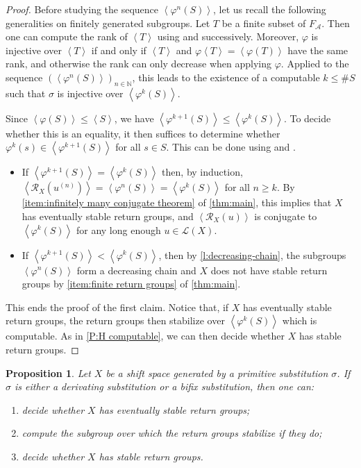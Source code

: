 \documentclass{amsart}
\newcommand*{\N}{\mathbb{N}}
\newcommand*{\ret}{\mathcal{R}}
\newcommand*{\lang}{\mathcal{L}}
\newcommand*{\cA}{\mathcal{A}}
\newcommand*{\card}{\#}
\newcommand*{\gen}[1]{\left\langle #1\right\rangle}
\theoremstyle{plain}
\newtheorem{proposition}[theorem]{Proposition}
\theoremstyle{definition}
\theoremstyle{remark}
\begin{document}
\begin{proof}
    Before studying the sequence $\gen{\varphi^n(S)}$, let us recall the following generalities on finitely generated subgroups. Let $T$ be a finite subset of $F_\cA$. Then one can compute the rank of $\gen{T}$ using \cite[Proposition~7.1]{Kapovich2002} and \cite[Proposition~8.2]{Kapovich2002} successively. Moreover, $\varphi$ is injective over $\gen{T}$ if and only if $\gen{T}$ and $\varphi\gen{T} = \gen{\varphi(T)}$ have the same rank, and otherwise the rank can only decrease when applying $\varphi$.
    Applied to the sequence $(\gen{\varphi^n(S)})_{n \in \N}$, this leads to the existence of a computable $k \leq \card S$ such that $\sigma$ is injective over $\gen{\varphi^k(S)}$.

    Since $\gen{\varphi(S)} \leq \gen{S}$, we have $\gen{\varphi^{k+1}(S)} \leq \gen{\varphi^k(S)}$.
    To decide whether this is an equality, it then suffices to determine whether $\varphi^k(s) \in \gen{\varphi^{k+1}(S)}$ for all $s \in S$. This can be done using \cite[Proposition~7.1]{Kapovich2002} and \cite[Proposition~7.2]{Kapovich2002}.
    \begin{itemize}
    \item If $\gen{\varphi^{k+1}(S)} = \gen{\varphi^k(S)}$ then, by induction, $\gen{\ret_X(u^{(n)})} = \gen{\varphi^n(S)} = \gen{\varphi^k(S)}$ for all $n \geq k$. By \cref{item:infinitely many conjugate theorem} of \cref{thm:main}, this implies that $X$ has eventually stable return groups, and $\gen{\ret_X(u)}$ is conjugate to $\gen{\varphi^k(S)}$ for any long enough $u \in \lang(X)$.
    \item If $\gen{\varphi^{k+1}(S)} < \gen{\varphi^k(S)}$, then by \cref{l:decreasing-chain}, the subgroups $\gen{\varphi^n(S)}$ form a decreasing chain and $X$ does not have stable return groups by \cref{item:finite return groups} of \cref{thm:main}. 
    \end{itemize}
    This ends the proof of the first claim. Notice that, if $X$ has eventually stable return groups, the return groups then stabilize over $\gen{\varphi^k(S)}$ which is computable. As in \cref{P:H computable}, we can then decide whether $X$ has stable return groups.
\end{proof}

\begin{proposition}\label{P:decidable for derivating and bifix}
    Let $X$ be a shift space generated by a primitive substitution $\sigma$. If $\sigma$ is either a derivating substitution or a bifix substitution, then one can:
    \begin{enumerate}
        \item decide whether $X$ has eventually stable return groups;
        \item compute the subgroup over which the return groups stabilize if they do;
        \item decide whether $X$ has stable return groups.
    \end{enumerate}
\end{proposition}
\end{document}
